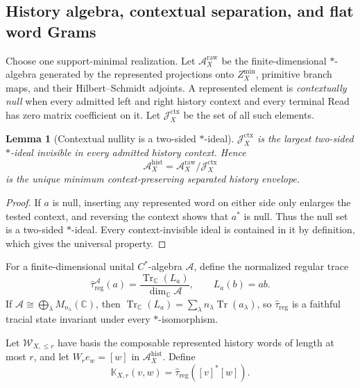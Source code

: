 \documentclass[11pt]{article}
\numberwithin{equation}{section}
\newtheorem{lemma}[lemma]{Lemma}
\theoremstyle{definition}
\theoremstyle{remark}
\newcommand{\C}{\mathbb C}
\newcommand{\Tr}{\operatorname{Tr}}
\begin{document}
\subsection{History algebra, contextual separation, and flat word Grams}

Choose one support-minimal realization.  Let $\mathcal A_X^{\mathrm{raw}}$ be
the finite-dimensional $*$-algebra generated by the represented projections
onto $Z_X^{\min}$, primitive branch maps, and their Hilbert--Schmidt adjoints.
A represented element is \emph{contextually null} when every admitted left and
right history context and every terminal Read has zero matrix coefficient on
it.  Let $\mathcal J_X^{\mathrm{ctx}}$ be the set of all such elements.

\begin{lemma}[Contextual nullity is a two-sided $*$-ideal]
\label{lem:supp-contextual-ideal}
$\mathcal J_X^{\mathrm{ctx}}$ is the largest two-sided $*$-ideal invisible in
every admitted history context.  Hence
\begin{equation}
 \mathcal A_X^{\mathrm{hist}}
 =\mathcal A_X^{\mathrm{raw}}/\mathcal J_X^{\mathrm{ctx}}
 \label{eq:supp-history-algebra}
\end{equation}
is the unique minimum context-preserving separated history envelope.
\end{lemma}

\begin{proof}
If $a$ is null, inserting any represented word on either side only enlarges the
tested context, and reversing the context shows that $a^*$ is null.  Thus the
null set is a two-sided $*$-ideal.  Every context-invisible ideal is contained
in it by definition, which gives the universal property.
\end{proof}

For a finite-dimensional unital $C^*$-algebra $\mathcal A$, define the
normalized regular trace
\begin{equation}
 \widehat\tau_{\mathrm{reg}}^{\mathcal A}(a)
 =\frac{\Tr_{\C}(L_a)}{\dim_{\C}\mathcal A},
 \qquad L_a(b)=ab.
 \label{eq:supp-regular-trace}
\end{equation}
If $\mathcal A\cong\bigoplus_\lambda M_{n_\lambda}(\C)$, then
$\Tr_{\C}(L_a)=\sum_\lambda n_\lambda\Tr(a_\lambda)$, so
$\widehat\tau_{\mathrm{reg}}$ is a faithful tracial state invariant under every
$*$-isomorphism.

Let $\mathcal W_{X,\le r}$ have basis the composable represented history words
of length at most $r$, and let $W_re_w=[w]$ in
$\mathcal A_X^{\mathrm{hist}}$.  Define
\begin{equation}
 \mathbb K_{X,r}(v,w)
 =\widehat\tau_{\mathrm{reg}}([v]^*[w]).
 \label{eq:supp-word-gram}
\end{equation}
\end{document}
